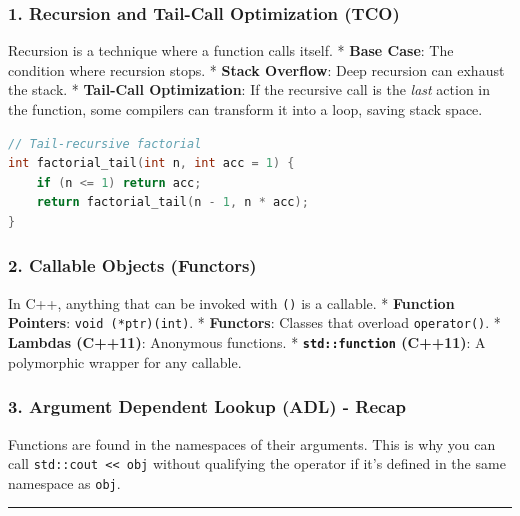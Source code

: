 \hypertarget{recursion-and-tail-call-optimization-tco}{%
\subsubsection{1. Recursion and Tail-Call Optimization
(TCO)}\label{recursion-and-tail-call-optimization-tco}}

Recursion is a technique where a function calls itself. * \textbf{Base
Case}: The condition where recursion stops. * \textbf{Stack Overflow}:
Deep recursion can exhaust the stack. * \textbf{Tail-Call Optimization}:
If the recursive call is the \emph{last} action in the function, some
compilers can transform it into a loop, saving stack space.

\begin{lstlisting}[language={C++}]
// Tail-recursive factorial
int factorial_tail(int n, int acc = 1) {
    if (n <= 1) return acc;
    return factorial_tail(n - 1, n * acc);
}
\end{lstlisting}

\hypertarget{callable-objects-functors}{%
\subsubsection{2. Callable Objects
(Functors)}\label{callable-objects-functors}}

In C++, anything that can be invoked with \passthrough{\lstinline!()!}
is a callable. * \textbf{Function Pointers}:
\passthrough{\lstinline!void (*ptr)(int)!}. * \textbf{Functors}: Classes
that overload \passthrough{\lstinline!operator()!}. * \textbf{Lambdas
(C++11)}: Anonymous functions. *
\textbf{\passthrough{\lstinline!std::function!} (C++11)}: A polymorphic
wrapper for any callable.

\hypertarget{argument-dependent-lookup-adl---recap}{%
\subsubsection{3. Argument Dependent Lookup (ADL) -
Recap}\label{argument-dependent-lookup-adl---recap}}

Functions are found in the namespaces of their arguments. This is why
you can call \passthrough{\lstinline!std::cout << obj!} without
qualifying the operator if it's defined in the same namespace as
\passthrough{\lstinline!obj!}.

\begin{center}\rule{0.5\linewidth}{0.5pt}\end{center}

